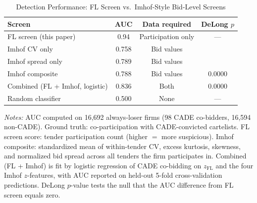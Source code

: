 \begin{table}[htbp]
\centering
\caption{Detection Performance: FL Screen vs.\ Imhof-Style Bid-Level Screens}
\label{tab:imhof_comparison}
\begin{threeparttable}
\small
\begin{tabular}{lccc}
\toprule
Screen & AUC & Data required & DeLong $p$ \\
\midrule
FL screen (this paper) & 0.94 & Participation only & --- \\
Imhof CV only & 0.758 & Bid values & \\
Imhof spread only & 0.789 & Bid values & \\
Imhof composite & 0.788 & Bid values & 0.0000 \\
Combined (FL + Imhof, logistic) & 0.836 & Both & 0.0000 \\
Random classifier & 0.500 & None & --- \\
\bottomrule
\end{tabular}
\begin{tablenotes}
\small
\item \textit{Notes:} AUC computed on 16,692 always-loser firms
(98 CADE co-bidders, 16,594 non-CADE).
Ground truth: co-participation with CADE-convicted cartelists.
FL screen score: tender participation count (higher $=$ more suspicious).
Imhof composite: standardized mean of within-tender CV, excess kurtosis,
skewness, and normalized bid spread across all tenders the firm participates in.
Combined (FL + Imhof) is fit by logistic regression of CADE co-bidding on
$z_{\mathrm{FL}}$ and the four Imhof $z$-features, with AUC reported on
held-out 5-fold cross-validation predictions.
DeLong $p$-value tests the null that the AUC difference from FL screen equals zero.
\end{tablenotes}
\end{threeparttable}
\end{table}
